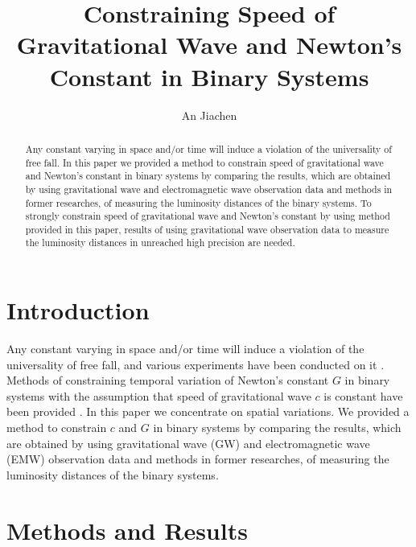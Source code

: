 \documentclass{article}
\title{Constraining Speed of Gravitational Wave and {N}ewton's Constant in Binary Systems}
\author{An Jiachen}
\date{}
\begin{document}
\maketitle

\begin{abstract}
    Any constant varying in space and/or time will induce a violation of the universality of free fall. In this paper we provided a method to constrain speed of gravitational wave and Newton's constant in binary systems by comparing the results, which are obtained by using gravitational wave and electromagnetic wave observation data and methods in former researches, of measuring the luminosity distances of the binary systems. To strongly constrain speed of gravitational wave and Newton's constant by using method provided in this paper, results of using gravitational wave observation data to measure the luminosity distances in unreached high precision are needed.
\end{abstract}

\section{Introduction}

Any constant varying in space and/or time will induce a violation of the universality of free fall, and various experiments have been conducted on it \cite{Uzan2011}. Methods of constraining temporal variation of Newton's constant $G$ in binary systems with the assumption that speed of gravitational wave $c$ is constant have been provided \cite{Yunes2010}. In this paper we concentrate on spatial variations. We provided a method to constrain $c$ and $G$ in binary systems by comparing the results, which are obtained by using gravitational wave (GW) and electromagnetic wave (EMW) observation data and methods in former researches, of measuring the luminosity distances of the binary systems.

\section{Methods and Results}
\end{document}
